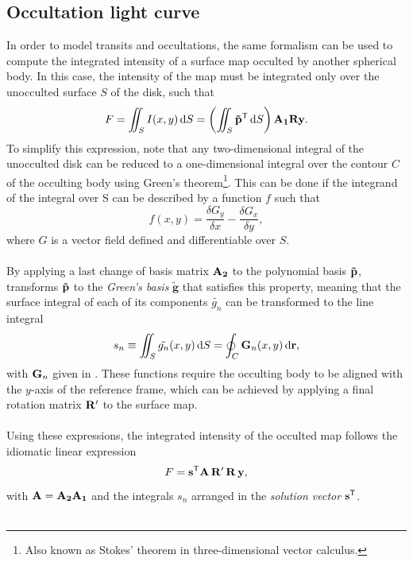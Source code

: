 \documentclass[modern]{aastex631}
\begin{document}
\subsection{Occultation light curve}\label{occultation}
In order to model transits and occultations, the same formalism can be used to compute the integrated intensity of a surface map occulted by another spherical body. In this case, the intensity of the map must be integrated only over the unocculted surface $S$ of the disk, such that 
\begin{equation} F = \iint_S I(x,y)\,\text{d}S = \left(\iint_S \bvec{\tilde p^\mathsf{T}}\,\text{d}S\right)\bvec{A_1}\bvec{R}\bvec{y}.\end{equation}
To simplify this expression, \cite{pal2012} note that any two-dimensional integral of the unocculted disk can be reduced to a one-dimensional integral over the contour $C$ of the occulting body using Green's theorem\footnote{Also known as Stokes' theorem in three-dimensional vector calculus.}. This can be done if the integrand of the integral over S can be described by a function $f$ such that
\begin{equation}f(x, y) = \frac{\delta G_{y}}{\delta x}-\frac{\delta G_{x}}{\delta y},\end{equation}
where $G$ is a vector field defined and differentiable over $S$.\\\\
By applying a last change of basis matrix ${\mathbf{A_2}}$ to the polynomial basis ${\mathbf{\tilde p}}$, \cite{starry} transforms ${\mathbf{\tilde p}}$ to the \textit{Green's basis} $\bm{\tilde g}$ that satisfies this property, meaning that the surface integral of each of its components $\tilde{g_n}$ can be transformed to the line integral
\begin{equation}
    \label{eq:sn_gn}
    s_n \equiv \iint_S \tilde{g_n}(x, y)\,\text{d}S = \oint_C \bvec{G}_n(x, y)\,\text{d}\bvec{r},
\end{equation}
with ${\mathbf{G}}_n$ given in \citealt[Equation 34]{starry}. These functions require the occulting body to be aligned with the $y$-axis of the reference frame, which can be achieved by applying a final rotation matrix ${\mathbf{R'}}$ to the surface map.\\\\
Using these expressions, the integrated intensity of the occulted map follows the idiomatic linear expression 
\begin{equation}
    \label{eq:starry}
    F = \bvec{s^\mathsf{T}}\bvec{A}\,\bvec{R'}\,\bvec{R}\,\bvec{y},
\end{equation}
with ${\mathbf{A}} = {\mathbf{A_2A_1}}$ and the integrals $s_n$ arranged in the \textit{solution vector} ${\mathbf{s^\mathsf{T}}}$.\\\\
\end{document}
